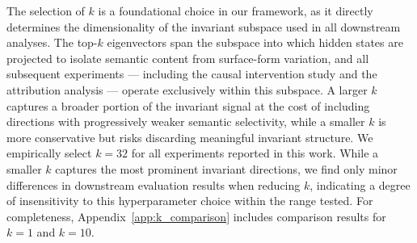 The selection of $k$ is a foundational choice in our framework, as it directly determines the dimensionality of the invariant subspace used in all downstream analyses. The top-$k$ eigenvectors span the subspace into which hidden states are projected to isolate semantic content from surface-form variation, and all subsequent experiments — including the causal intervention study and the attribution analysis — operate exclusively within this subspace. A larger $k$ captures a broader portion of the invariant signal at the cost of including directions with progressively weaker semantic selectivity, while a smaller $k$ is more conservative but risks discarding meaningful invariant structure. We empirically select $k = 32$ for all experiments reported in this work. While a smaller $k$ captures the most prominent invariant directions, we find only minor differences in downstream evaluation results when reducing $k$, indicating a degree of insensitivity to this hyperparameter choice within the range tested. For completeness, Appendix~\ref{app:k_comparison} includes comparison results for $k = 1$ and $k = 10$.






